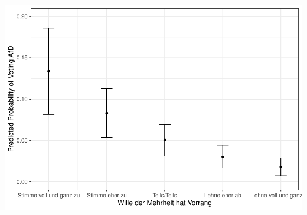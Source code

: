 \documentclass[
]{article}
\begin{document}
\includegraphics{AVCD_Final_Assignment-Edenhofer_latest_files/figure-latex/afd-majority-will-1.pdf}
\end{document}
